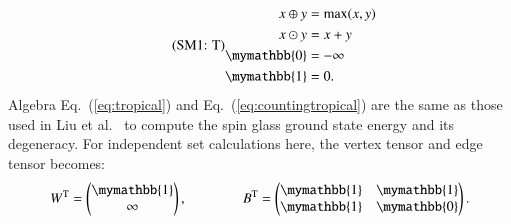 \documentclass[onefignum, onetabnum]{siamart190516}
\newcommand{\eqname}[1]{\stepcounter{equation}\tag{\theequation : #1}}
\newcommand{\<}{\langle}
\renewcommand{\>}{\rangle}
\newcommand{\Eq}[1]{Eq.~(\ref{#1})}
\begin{document}
\begin{equation}\eqname{T}
    \begin{split}
        x \oplus y &= \max(x,y)\\
        x \odot y &= x + y\\
        \mymathbb{0} &= -\infty\\
        \mymathbb{1} &= 0.
    \end{split}\label{eq:tropical}
\end{equation}
Algebra \Eq{eq:tropical} and \Eq{eq:countingtropical} are the same as those used in Liu et al.~\cite{Liu2021} to compute the spin glass ground state energy and its degeneracy.
For independent set calculations here, the vertex tensor and edge tensor becomes:
\begin{equation}
    W^{\rm T} = \left(\begin{matrix}
        \mymathbb{1} \\
        \infty
    \end{matrix}\right),   
    \qquad \qquad
        B^{\rm T} = \left(\begin{matrix}
        \mymathbb{1}  & \mymathbb{1} \\
        \mymathbb{1} & \mymathbb{0}
    \end{matrix}\right).
\end{equation}
\end{document}
